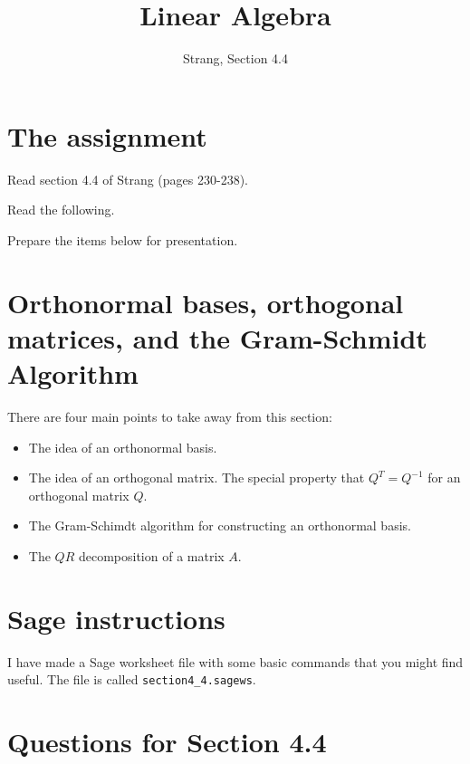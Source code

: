 \documentclass[11pt]{amsart}
\theoremstyle{definition}
\begin{document}
\title{Linear Algebra}
\author{Strang, Section 4.4}
\maketitle

\section{The assignment}
\begin{compactitem}
\item Read section 4.4 of Strang (pages 230-238).
\item Read the following.
\item Prepare the items below for presentation.
\end{compactitem}


\section{Orthonormal bases, orthogonal matrices, and the Gram-Schmidt Algorithm}

There are four main points to take away from this section:

\begin{itemize}
\item The idea of an orthonormal basis.

\item The idea of an orthogonal matrix. The special property that $Q^T = Q^{-1}$ for an orthogonal matrix $Q$.

\item The Gram-Schimdt algorithm for constructing an orthonormal basis.

\item The $QR$ decomposition of a matrix $A$.
\end{itemize}


\section{Sage instructions}

I have made a Sage worksheet file with some basic commands that you might find useful. The file is called \texttt{section4\_4.sagews}.


\section{Questions for Section 4.4}
\setcounter{exercise}{130}
\end{document}
